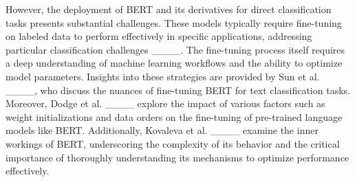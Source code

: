 However, the deployment of BERT and its derivatives for direct classification tasks presents substantial challenges. These models typically require fine-tuning on labeled data to perform effectively in specific applications, addressing particular classification challenges ____. The fine-tuning process itself requires a deep understanding of machine learning workflows and the ability to optimize model parameters. Insights into these strategies are provided by Sun et al. ____, who discuss the nuances of fine-tuning BERT for text classification tasks. Moreover, Dodge et al. ____ explore the impact of various factors such as weight initializations and data orders on the fine-tuning of pre-trained language models like BERT. Additionally, Kovaleva et al. ____ examine the inner workings of BERT, underscoring the complexity of its behavior and the critical importance of thoroughly understanding its mechanisms to optimize performance effectively.